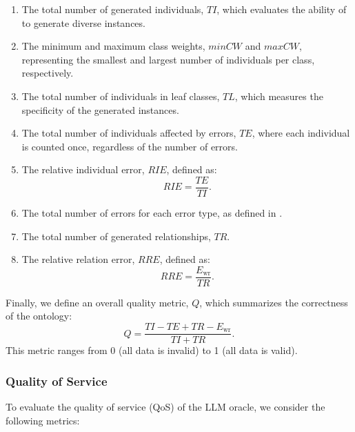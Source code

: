 %
\begin{enumerate}
    \item The total number of generated individuals, \(\mathit{TI}\), which evaluates the ability of \llmfkg{} to generate diverse instances.
    \item The minimum and maximum class weights, \(\mathit{minCW}\) and \(\mathit{maxCW}\), representing the smallest and largest number of individuals per class, respectively.
    \item The total number of individuals in leaf classes, \(\mathit{TL}\), which measures the specificity of the generated instances.
    \item The total number of individuals affected by errors, \(\mathit{TE}\), where each individual is counted once, regardless of the number of errors.
    \item The relative individual error, \(\mathit{RIE}\), defined as:
    \begin{equation}
        \label{eq:relative_individual_error}
        \mathit{RIE} = \frac{\mathit{TE}}{\mathit{TI}}.
    \end{equation}
    \item The total number of errors for each error type, as defined in .
    \item The total number of generated relationships, \(\mathit{TR}\).
    \item The relative relation error, \(\mathit{RRE}\), defined as:
    \begin{equation}
        \label{eq:relative_relation_error}
        \mathit{RRE} = \frac{E_{\text{wr}}}{\mathit{TR}}.
    \end{equation}
\end{enumerate}

%
Finally, we define an overall quality metric, \(Q\), which summarizes the correctness of the ontology:
%
\begin{equation}
    \label{eq:quality_metric}
    Q = \frac{\mathit{TI} - \mathit{TE} + \mathit{TR} - E_{\text{wr}}}{\mathit{TI} + \mathit{TR}}.
\end{equation}
%
This metric ranges from 0 (all data is invalid) to 1 (all data is valid).

%
\subsubsection{Quality of Service}

To evaluate the quality of service (QoS) of the \gls{LLM} oracle, we consider the following metrics:

